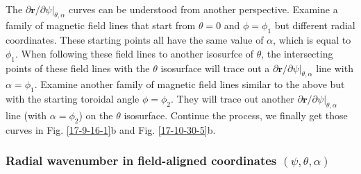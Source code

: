 \documentclass{llncs}
\newcommand{\nobracket}{}
\begin{document}
\

The $\partial \mathbf{r}/ \partial \psi |_{\theta, \alpha} \nobracket$ curves
can be understood from another perspective. Examine a family of magnetic field
lines that start from $\theta = 0$ and $\phi = \phi_1$ but different radial
coordinates. These starting points all have the same value of $\alpha$, which
is equal to $\phi_1$. When following these field lines to another isosurfce of
$\theta$, the intersecting points of these field lines with the $\theta$
isosurface will trace out a $\partial \mathbf{r}/ \partial \psi |_{\theta,
\alpha} \nobracket$ line with $\alpha = \phi_1$. Examine another family of
magnetic field lines similar to the above but with the starting toroidal angle
$\phi = \phi_2$. They will trace out another $\partial \mathbf{r}/ \partial
\psi |_{\theta, \alpha} \nobracket$ line (with $\alpha = \phi_2$) on the
$\theta$ isosurface. Continue the process, we finally get those curves in Fig.
\ref{17-9-16-1}b and Fig. \ref{17-10-30-5}b.

\subsubsection{Radial wavenumber in field-aligned coordinates $(\psi, \theta,
\alpha)$}
\end{document}
